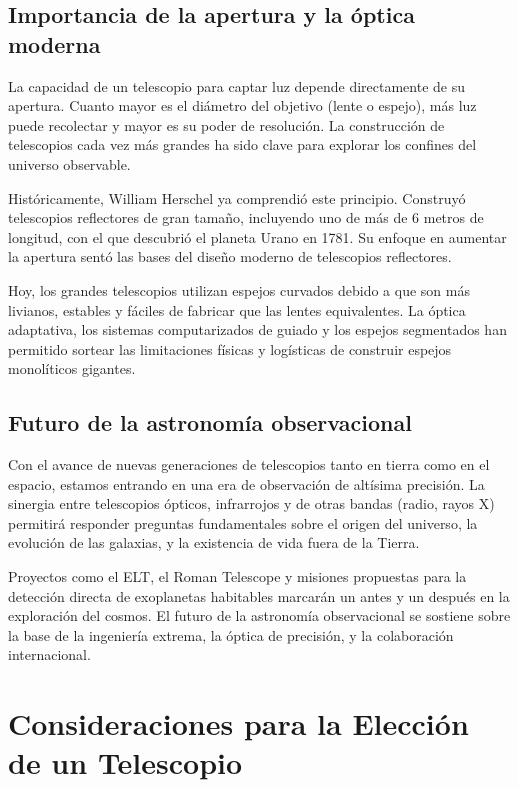 \subsection*{Importancia de la apertura y la óptica moderna}

La capacidad de un telescopio para captar luz depende directamente de su apertura. Cuanto mayor es el diámetro del objetivo (lente o espejo), más luz puede recolectar y mayor es su poder de resolución. La construcción de telescopios cada vez más grandes ha sido clave para explorar los confines del universo observable.

Históricamente, William Herschel ya comprendió este principio. Construyó telescopios reflectores de gran tamaño, incluyendo uno de más de 6 metros de longitud, con el que descubrió el planeta Urano en 1781. Su enfoque en aumentar la apertura sentó las bases del diseño moderno de telescopios reflectores.

Hoy, los grandes telescopios utilizan espejos curvados debido a que son más livianos, estables y fáciles de fabricar que las lentes equivalentes. La óptica adaptativa, los sistemas computarizados de guiado y los espejos segmentados han permitido sortear las limitaciones físicas y logísticas de construir espejos monolíticos gigantes.

\subsection*{Futuro de la astronomía observacional}

Con el avance de nuevas generaciones de telescopios tanto en tierra como en el espacio, estamos entrando en una era de observación de altísima precisión. La sinergia entre telescopios ópticos, infrarrojos y de otras bandas (radio, rayos X) permitirá responder preguntas fundamentales sobre el origen del universo, la evolución de las galaxias, y la existencia de vida fuera de la Tierra.

Proyectos como el ELT, el Roman Telescope y misiones propuestas para la detección directa de exoplanetas habitables marcarán un antes y un después en la exploración del cosmos. El futuro de la astronomía observacional se sostiene sobre la base de la ingeniería extrema, la óptica de precisión, y la colaboración internacional.



\section{Consideraciones para la Elección de un Telescopio}
\label{sec:consideraciones_para_elegir_telescopio}

